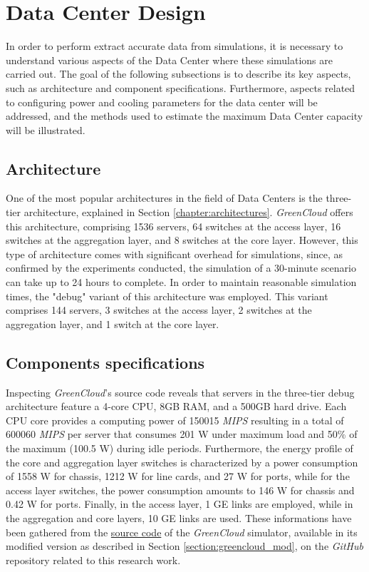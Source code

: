 \section{Data Center Design}
In order to perform extract accurate data from simulations, it is necessary to understand various aspects of the Data Center where these simulations are carried out. The goal of the following subsections is to describe its key aspects, such as architecture and component specifications. Furthermore, aspects related to configuring power and cooling parameters for the data center will be addressed, and the methods used to estimate the maximum Data Center capacity will be illustrated.

\subsection{Architecture}
One of the most popular architectures in the field of Data Centers is the three-tier architecture, explained in Section \ref{chapter:architectures}. \emph{GreenCloud} offers this architecture, comprising 1536 servers, 64 switches at the access layer, 16 switches at the aggregation layer, and 8 switches at the core layer. However, this type of architecture comes with significant overhead for simulations, since, as confirmed by the experiments conducted, the simulation of a 30-minute scenario can take up to 24 hours to complete. In order to maintain reasonable simulation times, the "debug" variant of this architecture was employed. This variant comprises 144 servers, 3 switches at the access layer, 2 switches at the aggregation layer, and 1 switch at the core layer. 

\subsection{Components specifications} \label{subsection:components_spec}
Inspecting \emph{GreenCloud}'s source code reveals that servers in the three-tier debug architecture feature a 4-core CPU, 8GB RAM, and a 500GB hard drive. Each CPU core provides a computing power of 150015 \emph{MIPS} resulting in a total of 600060 \emph{MIPS} per server that consumes 201 W under maximum load and 50\% of the maximum (100.5 W) during idle periods. Furthermore, the energy profile of the core and aggregation layer switches is characterized by a power consumption of 1558 W for chassis, 1212 W for line cards, and 27 W for ports, while for the access layer switches, the power consumption amounts to 146 W for chassis and 0.42 W for ports. Finally, in the access layer, 1 GE links are employed, while in the aggregation and core layers, 10 GE links are used. These informations have been gathered from the \href{https://github.com/vincenzo-emanuele/masters-degree-thesis/tree/main/greencloud_modified_src}{source code} of the \emph{GreenCloud} simulator, available in its modified version as described in Section \ref{section:greencloud_mod}, on the \emph{GitHub} repository related to this research work. 

